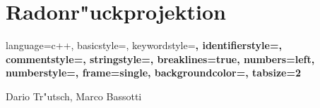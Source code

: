 \chapter{Radonr"uckprojektion}
\begin{refsection}
{
	
	\lstset
	{
		language=c++,
		basicstyle=\scriptsize\ttfamily,
		keywordstyle=\color{red}\bfseries,
		identifierstyle=\color{blue},
		commentstyle=\color{radon_Green},
		stringstyle=\ttfamily,
		breaklines=true,
		numbers=left,
		numberstyle=\tiny,
		frame=single,
		backgroundcolor=\color{radon_Grey},
		tabsize=2
	}
	
	\def\chapterauthor#1{{\large #1}\bigskip\bigskip}	
	\chapterauthor{Dario Tr"utsch, Marco Bassotti}

	
			
		
			
			
	
			

\printbibliography[heading=subbibliography]

}
\end{refsection}


